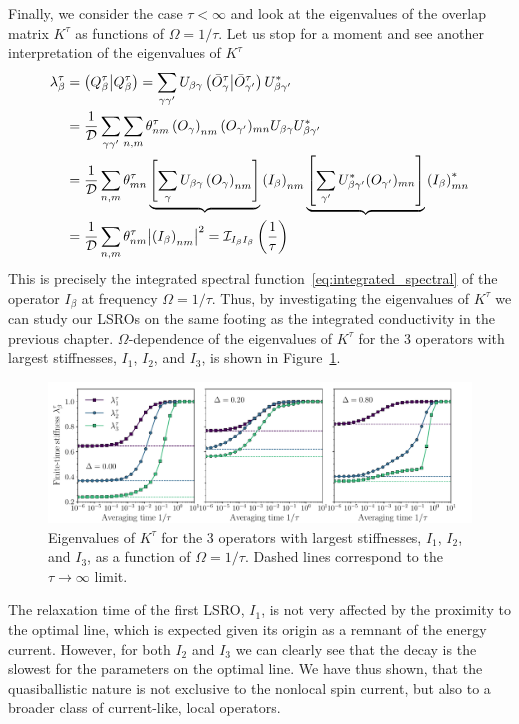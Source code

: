 Finally, we consider the case \(\tau < \infty\) and look at the eigenvalues
of the overlap matrix \(K^{\tau}\) as functions of \(\Omega = 1/\tau\). Let us stop
for a moment and see another interpretation of the eigenvalues of \(K^{\tau}\)
\begin{align}
  \lambda^{\tau}_{\beta} &= \left(Q_{\beta}^{\tau} \middle| Q_{\beta}^{\tau}\right) = \sum_{\gamma\gamma^{\prime}}
  U_{\beta\gamma}\left(\bar{O}^{\tau}_{\gamma} \middle| \bar{O}^{\tau}_{\gamma^{\prime}}\right){U}^{\ast}_{\beta\gamma^{\prime}}\nonumber\\
  &= \frac{1}{\mathcal{D}} \sum_{\gamma\gamma^{\prime}}\sum_{n,m} \theta_{nm}^{\tau}
  \left(O_{\gamma}\right)_{nm} (O_{\gamma^{\prime}})_{mn} U_{\beta\gamma} {U}^{\ast}_{\beta\gamma^{\prime}}\nonumber\\
  &= \frac{1}{\mathcal{D}} \sum_{n,m} \theta_{mn}^{\tau} \underbrace{\left[\sum_{\gamma}U_{\beta\gamma} \left(O_{\gamma}\right)_{nm}\right]}{\left(I_{\beta}\right)_{nm}}
  \underbrace{\left[\sum_{\gamma^{\prime}}{U}^{\ast}_{\beta\gamma^{\prime}} (O_{\gamma^{\prime}})_{mn}\right]}{\left(I_{\beta}\right)^{\ast}_{mn}}\nonumber\\
  &= \frac{1}{\mathcal{D}} \sum_{n,m} \theta_{nm}^{\tau} \abs{\left(I_{\beta}\right)_{nm}}^2 = \mathcal{I}_{I_{\beta}I_{\beta}}\left(\frac{1}{\tau}\right)
\end{align} 
This is precisely the integrated spectral function~\eqref{eq:integrated_spectral} of the operator \(I_{\beta}\) at frequency \(\Omega = 1/\tau\).
Thus, by investigating the eigenvalues of \(K^{\tau}\) we can study our LSROs on the same footing as the integrated
conductivity in the previous chapter. \(\Omega\)-dependence of the eigenvalues of \(K^{\tau}\) for the 3 operators
with largest stiffnesses, \(I_1\), \(I_2\), and \(I_3\), is shown in Figure~\ref{fig:lsro_eigenvalues}.

\begin{figure}[htbp]
  \centering
  \includegraphics[width=\linewidth]{Figures/finite_time_stiffness.pdf}
  \caption{Eigenvalues of \(K^{\tau}\) for the 3 operators with largest stiffnesses, \(I_1\), \(I_2\), and \(I_3\),
  as a function of \(\Omega = 1/\tau\). Dashed lines correspond to the \(\tau\to\infty\) limit.}
  \label{fig:lsro_eigenvalues}
\end{figure}

The relaxation time of the first LSRO, \(I_1\), is not very affected by the proximity to the optimal line,
which is expected given its origin as a remnant of the energy current. However, for both
\(I_2\) and \(I_3\) we can clearly see that the decay is the slowest for the parameters on the optimal line.
We have thus shown, that the quasiballistic nature is not exclusive to the nonlocal spin current,
but also to a broader class of current-like, local operators.

